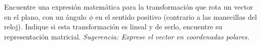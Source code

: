 \begin{problema}
 Encuentre una expresi\'on matemática para la transformaci\'on que rota un vector en el plano, con un ángulo $\phi$
en el sentido positivo (contrario a las manecillas del reloj). Indique si esta transformaci\'on es lineal y de serlo,
encuentre su representaci\'on matricial. \emph{Sugerencia: Exprese el vector en coordenadas polares.}
\end{problema}
